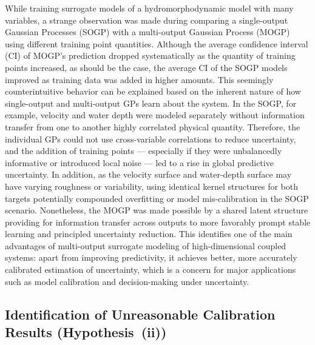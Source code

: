 \documentclass[draft,linenumbers,onecolumn]{agujournal2019} %
\begin{document}
While training surrogate models of a hydromorphodynamic model with many variables, a strange observation was made during comparing a single-output Gaussian Processes (SOGP) with a multi-output Gaussian Process (MOGP) using different training point quantities. Although the average confidence interval (CI) of MOGP's prediction dropped systematically as the quantity of training points increased, as should be the case, the average CI of the SOGP models improved as training data was added in higher amounts. This seemingly counterintuitive behavior can be explained based on the inherent nature of how single-output and multi-output GPs learn about the system. In the SOGP, for example, velocity and water depth were modeled separately without information transfer from one to another highly correlated physical quantity. Therefore, the individual GPs could not use cross-variable correlations to reduce uncertainty, and the addition of training points — especially if they were unbalancedly informative or introduced local noise — led to a rise in global predictive uncertainty. In addition, as the velocity surface and water-depth surface may have varying roughness or variability, using identical kernel structures for both targets potentially compounded overfitting or model mis-calibration in the SOGP scenario. Nonetheless, the MOGP was made possible by a shared latent structure providing for information transfer across outputs to more favorably prompt stable learning and principled uncertainty reduction. This identifies one of the main advantages of multi-output surrogate modeling of high-dimensional coupled systems: apart from improving predictivity, it achieves better, more accurately calibrated estimation of uncertainty, which is a concern for major applications such as model calibration and decision-making under uncertainty.

\subsection{Identification of Unreasonable Calibration Results (Hypothesis~(ii))}
\end{document}
